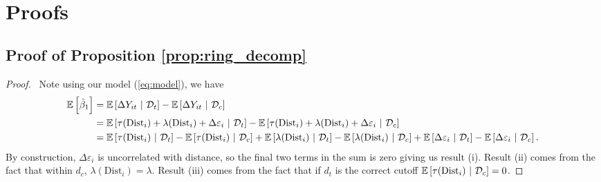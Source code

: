 \documentclass[10pt]{article}
\newcommand{\dist}{\text{Dist}}
\begin{document}
\newpage~

\appendix 

\section{Proofs}
\label{sec:proofs}

\subsection{Proof of Proposition \ref{prop:ring_decomp}}

\begin{proof}
    \ Note using our model (\ref{eq:model}), we have 
    \begin{align*}
        \expec{\hat{\beta}_1} &= \condexpec{\Delta Y_{it}}{\mathcal{D}_t} - \condexpec{\Delta Y_{it}}{\mathcal{D}_c} \\
        &= \condexpec{\tau(\dist_i) + \lambda(\dist_i) + \Delta \varepsilon_{i}}{\mathcal{D}_t} - \condexpec{\tau(\dist_i) + \lambda(\dist_i) + \Delta \varepsilon_{i}}{\mathcal{D}_c} \\ 
        &= \condexpec{\tau(\dist_i)}{\mathcal{D}_t} - \condexpec{\tau(\dist_i)}{\mathcal{D}_c} + \condexpec{\lambda(\dist_i)}{\mathcal{D}_t} - \condexpec{\lambda(\dist_i)}{\mathcal{D}_c} + \condexpec{\Delta\varepsilon_i}{\mathcal{D}_t} - \condexpec{\Delta\varepsilon_i}{\mathcal{D}_c}.
    \end{align*}
    By construction, $\Delta \varepsilon_i$ is uncorrelated with distance, so the final two terms in the sum is zero giving us result (i). Result (ii) comes from the fact that within $d_c$, $\lambda(\dist_i) = \lambda$. Result (iii) comes from the fact that if $d_t$ is the correct cutoff $\condexpec{\tau(\dist_i)}{\mathcal{D}_c} = 0$.
\end{proof}
\end{document}
